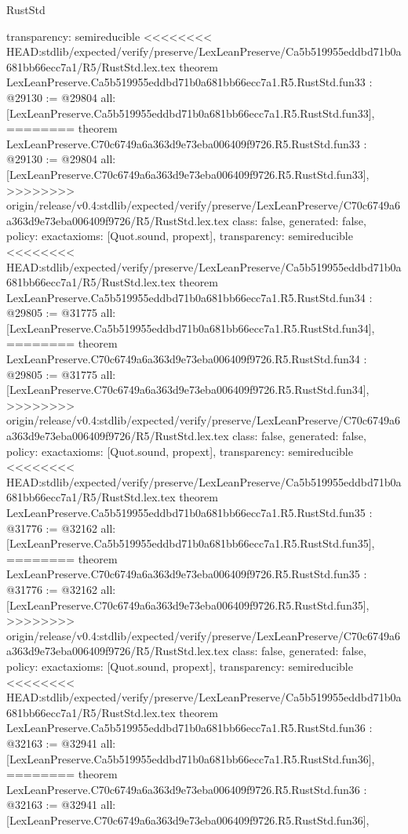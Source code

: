 \begin{lexlean}{RustStd}
\begin{coremodule}
{\begin{coremodule}
{{{{{{{{{{{{{{{{{{{{{{{{{{{{{{{{{{{{  transparency: semireducible
}
<<<<<<<< HEAD:stdlib/expected/verify/preserve/LexLeanPreserve/Ca5b519955eddbd71b0a681bb66ecc7a1/R5/RustStd.lex.tex
theorem LexLeanPreserve.Ca5b519955eddbd71b0a681bb66ecc7a1.R5.RustStd.fun33 : @29130 := @29804 {
  all: [LexLeanPreserve.Ca5b519955eddbd71b0a681bb66ecc7a1.R5.RustStd.fun33],
========
theorem LexLeanPreserve.C70c6749a6a363d9e73eba006409f9726.R5.RustStd.fun33 : @29130 := @29804 {
  all: [LexLeanPreserve.C70c6749a6a363d9e73eba006409f9726.R5.RustStd.fun33],
>>>>>>>> origin/release/v0.4:stdlib/expected/verify/preserve/LexLeanPreserve/C70c6749a6a363d9e73eba006409f9726/R5/RustStd.lex.tex
  class: false,
  generated: false,
  policy: exact{axioms: [Quot.sound, propext]},
  transparency: semireducible
}
<<<<<<<< HEAD:stdlib/expected/verify/preserve/LexLeanPreserve/Ca5b519955eddbd71b0a681bb66ecc7a1/R5/RustStd.lex.tex
theorem LexLeanPreserve.Ca5b519955eddbd71b0a681bb66ecc7a1.R5.RustStd.fun34 : @29805 := @31775 {
  all: [LexLeanPreserve.Ca5b519955eddbd71b0a681bb66ecc7a1.R5.RustStd.fun34],
========
theorem LexLeanPreserve.C70c6749a6a363d9e73eba006409f9726.R5.RustStd.fun34 : @29805 := @31775 {
  all: [LexLeanPreserve.C70c6749a6a363d9e73eba006409f9726.R5.RustStd.fun34],
>>>>>>>> origin/release/v0.4:stdlib/expected/verify/preserve/LexLeanPreserve/C70c6749a6a363d9e73eba006409f9726/R5/RustStd.lex.tex
  class: false,
  generated: false,
  policy: exact{axioms: [Quot.sound, propext]},
  transparency: semireducible
}
<<<<<<<< HEAD:stdlib/expected/verify/preserve/LexLeanPreserve/Ca5b519955eddbd71b0a681bb66ecc7a1/R5/RustStd.lex.tex
theorem LexLeanPreserve.Ca5b519955eddbd71b0a681bb66ecc7a1.R5.RustStd.fun35 : @31776 := @32162 {
  all: [LexLeanPreserve.Ca5b519955eddbd71b0a681bb66ecc7a1.R5.RustStd.fun35],
========
theorem LexLeanPreserve.C70c6749a6a363d9e73eba006409f9726.R5.RustStd.fun35 : @31776 := @32162 {
  all: [LexLeanPreserve.C70c6749a6a363d9e73eba006409f9726.R5.RustStd.fun35],
>>>>>>>> origin/release/v0.4:stdlib/expected/verify/preserve/LexLeanPreserve/C70c6749a6a363d9e73eba006409f9726/R5/RustStd.lex.tex
  class: false,
  generated: false,
  policy: exact{axioms: [Quot.sound, propext]},
  transparency: semireducible
}
<<<<<<<< HEAD:stdlib/expected/verify/preserve/LexLeanPreserve/Ca5b519955eddbd71b0a681bb66ecc7a1/R5/RustStd.lex.tex
theorem LexLeanPreserve.Ca5b519955eddbd71b0a681bb66ecc7a1.R5.RustStd.fun36 : @32163 := @32941 {
  all: [LexLeanPreserve.Ca5b519955eddbd71b0a681bb66ecc7a1.R5.RustStd.fun36],
========
theorem LexLeanPreserve.C70c6749a6a363d9e73eba006409f9726.R5.RustStd.fun36 : @32163 := @32941 {
  all: [LexLeanPreserve.C70c6749a6a363d9e73eba006409f9726.R5.RustStd.fun36],
}}}}}}}}}}}}}}}}}}}}}}}}}}}}}}}}}}}}}}}}
\end{coremodule}}
\end{coremodule}
\end{lexlean}
